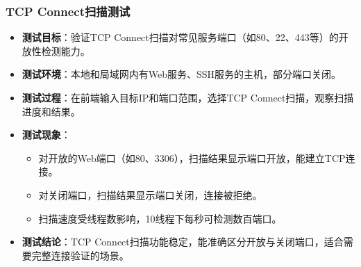 \documentclass[12pt,hyperref,a4paper,UTF8]{ctexart}
\begin{document}
\subsubsection{TCP Connect扫描测试}
\begin{itemize}
    \item \textbf{测试目标}：验证TCP Connect扫描对常见服务端口（如80、22、443等）的开放性检测能力。
    \item \textbf{测试环境}：本地和局域网内有Web服务、SSH服务的主机，部分端口关闭。
    \item \textbf{测试过程}：在前端输入目标IP和端口范围，选择TCP Connect扫描，观察扫描进度和结果。
    \item \textbf{测试现象}：
        \begin{itemize}
            \item 对开放的Web端口（如80、3306），扫描结果显示端口开放，能建立TCP连接。
            \item 对关闭端口，扫描结果显示端口关闭，连接被拒绝。
            \item 扫描速度受线程数影响，10线程下每秒可检测数百端口。
        \end{itemize}
    \item \textbf{测试结论}：TCP Connect扫描功能稳定，能准确区分开放与关闭端口，适合需要完整连接验证的场景。
\end{itemize}
\end{document}
